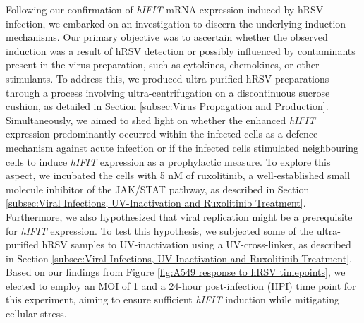 Following our confirmation of \textit{hIFIT} mRNA expression induced by hRSV infection, we embarked on an investigation to discern the underlying induction mechanisms. Our primary objective was to ascertain whether the observed induction was a result of hRSV detection or possibly influenced by contaminants present in the virus preparation, such as cytokines, chemokines, or other stimulants. To address this, we produced ultra-purified hRSV preparations through a process involving ultra-centrifugation on a discontinuous sucrose cushion, as detailed in Section \ref{subsec:Virus Propagation and Production}. Simultaneously, we aimed to shed light on whether the enhanced \textit{hIFIT} expression predominantly occurred within the infected cells as a defence mechanism against acute infection or if the infected cells stimulated neighbouring cells to induce \textit{hIFIT} expression as a prophylactic measure. To explore this aspect, we incubated the cells with 5 nM of ruxolitinib, a well-established small molecule inhibitor of the JAK/STAT pathway, as described in Section \ref{subsec:Viral Infections, UV-Inactivation and Ruxolitinib Treatment}. Furthermore, we also hypothesized that viral replication might be a prerequisite for \textit{hIFIT} expression. To test this hypothesis, we subjected some of the ultra-purified hRSV samples to UV-inactivation using a UV-cross-linker, as described in Section \ref{subsec:Viral Infections, UV-Inactivation and Ruxolitinib Treatment}. Based on our findings from Figure \ref{fig:A549 response to hRSV timepoints}, we elected to employ an MOI of 1 and a 24-hour post-infection (HPI) time point for this experiment, aiming to ensure sufficient \textit{hIFIT} induction while mitigating cellular stress.


